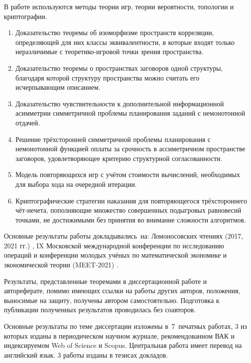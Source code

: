 {\methods} В работе используются методы теории игр, теории вероятности, топологии и криптографии.

{}
\begin{enumerate}[beginpenalty=10000] %
  \item Доказательство теоремы об изоморфизме пространств корреляции, определяющей для них классы эквивалентности, в которые входят только неразличимые с теоретико-игровой точки зрения пространства.
  \item Доказательство теоремы о пространствах заговоров одной структуры, благодаря которой структуру пространства можно считать его исчерпывающим описанием.
  \item Доказательство чувствительности к дополнительной информационной асимметрии симметричной проблемы планирования заданий с немонотонной отдачей.
  \item Решение трёхсторонней симметричной проблемы планирования с немонотонной функцией оплаты за срочность в ассиметричном пространстве заговоров, удовлетворяющее критерию структурной согласованности.
  \item Модель повторяющихся игр с учётом стоимости вычислений, необходимых для выбора хода на очередной итерации.
  \item Криптографические стратегии наказания для повторяющегося трёхстороннего чёт-нечета, пополняющие множество совершенных подыгровых равновесий точками, не достижимыми без принятия во внимание сложности алгоритмов.
\end{enumerate}


{\probation}
Основные результаты работы докладывались~на: Ломоносовских чтениях (2017, 2021 гг.) \cite{ownlmr2017, ownlmr2021}, IX Московской международной конференции по исследованию операций \cite{ownorm2018} и конференции молодых учёных по математической экономике и экономической теории (MEET-2021) \cite{meet2021}.

{\contribution} Результаты, представленные теоремами в диссертационной работе и автореферате, помимо имеющих ссылки на работы других авторов, положения, выносимые на защиту, получены автором самостоятельно. Подготовка к публикации полученных результатов проводилась без соавторов.

{\publications} Основные результаты по теме диссертации изложены в~7~печатных работах, 3 из которых \cite{ownconsp}\cite{owncards}\cite{ownsched} изданы в периодическом научном журнале, рекомендованном ВАК и индексируемом Web of Science и Scopus. Центральная работа имеет перевод на английский язык\cite{ownconsp_eng}. 3 работы изданы в тезисах докладов.
